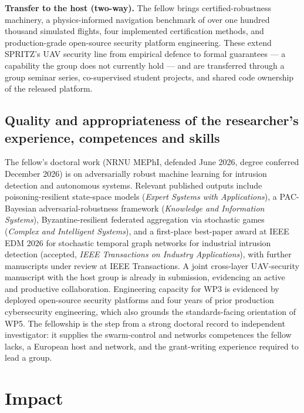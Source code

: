\documentclass[11pt,a4paper]{article}
\begin{document}
\textbf{Transfer to the host (two-way).} The fellow brings certified-robustness machinery, a physics-informed navigation benchmark of over one hundred thousand simulated flights, four implemented certification methods, and production-grade open-source security platform engineering. These extend SPRITZ's UAV security line from empirical defence to formal guarantees --- a capability the group does not currently hold --- and are transferred through a group seminar series, co-supervised student projects, and shared code ownership of the released platform.

\subsection{Quality and appropriateness of the researcher's experience, competences and skills}
The fellow's doctoral work (NRNU MEPhI, defended June 2026, degree conferred December 2026) is on adversarially robust machine learning for intrusion detection and autonomous systems. Relevant published outputs include poisoning-resilient state-space models (\emph{Expert Systems with Applications}), a PAC-Bayesian adversarial-robustness framework (\emph{Knowledge and Information Systems}), Byzantine-resilient federated aggregation via stochastic games (\emph{Complex and Intelligent Systems}), and a first-place best-paper award at IEEE EDM 2026 for stochastic temporal graph networks for industrial intrusion detection (accepted, \emph{IEEE Transactions on Industry Applications}), with further manuscripts under review at IEEE Transactions. A joint cross-layer UAV-security manuscript with the host group is already in submission, evidencing an active and productive collaboration. Engineering capacity for WP3 is evidenced by deployed open-source security platforms and four years of prior production cybersecurity engineering, which also grounds the standards-facing orientation of WP5. The fellowship is the step from a strong doctoral record to independent investigator: it supplies the swarm-control and networks competences the fellow lacks, a European host and network, and the grant-writing experience required to lead a group.

\section{Impact}
\end{document}
